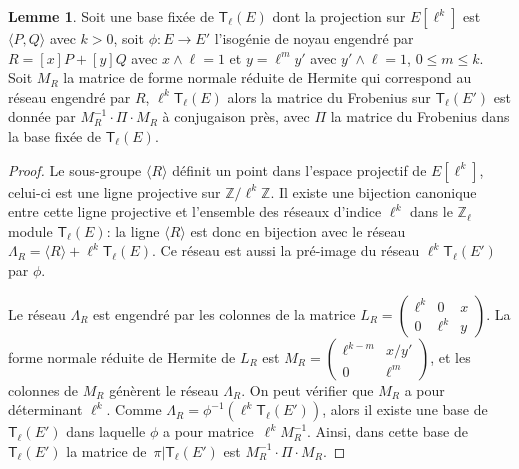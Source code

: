 \documentclass[10pt,a4paper]{book}
\theoremstyle{plain}
\theoremstyle{definition}
\theoremstyle{definition}
\newtheorem{lem}[thm]{Lemme}
\theoremstyle{definition}
\theoremstyle{definition}
\theoremstyle{definition}
\theoremstyle{remark}
\theoremstyle{remark}
\theoremstyle{definition}
\begin{document}
\begin{lem}
\label{lem:iso:con}
Soit une base fixée de $\mathsf{T}_{\ell}(E)$ dont la projection sur 
$E[\ell^{k}]$ est $\langle P, Q \rangle$ avec $k>0$, soit $\phi:E 
\rightarrow E'$ l'isogénie de noyau engendré par $R=[x]P+[y]Q$  avec $x\wedge 
\ell =1$ et $y=\ell^my'$ avec $y' \wedge \ell =1$, $0 \leqslant m \leqslant k$.
Soit $M_R$ la matrice de forme normale réduite de Hermite qui correspond au réseau 
engendré par $R$, $\ell^k\mathsf{T}_{\ell}(E)$ alors la matrice du Frobenius sur 
$\mathsf{T}_{\ell}(E')$ est donnée par $M_R^{-1} \cdot \Pi \cdot M_R$ à 
conjugaison près, avec $\Pi$ la matrice du Frobenius dans la base fixée de 
$\mathsf{T}_{\ell}(E)$.


%
% 
\end{lem}

\begin{proof}
Le sous-groupe $\langle R \rangle$ définit un point dans l'espace projectif de $E[\ell^k]$,
celui-ci est une ligne projective sur $\mathbb{Z}/\ell^k \mathbb{Z}$. Il existe 
une bijection canonique~\cite[II.1.1]{Serre77} entre cette ligne projective et 
l'ensemble des réseaux d'indice $\ell^k$ dans le $\mathbb{Z}_{\ell}$ module $\mathsf{T}_{\ell}(E)$:
la ligne $\langle R \rangle$ est donc en bijection avec le réseau~$\Lambda_R = 
\langle R \rangle + \ell^k \mathsf{T}_{\ell}(E)$. Ce réseau est aussi la pré-image du réseau 
$\ell^k\mathsf{T}_{\ell}(E')$ par $\phi$.

Le réseau $\Lambda_R$ est engendré par les colonnes de la matrice 
$L_R = \left (\begin{smallmatrix}\ell^k & 0 & x\\0 & \ell^k & y\end{smallmatrix} \right )$.
La forme normale réduite de Hermite de $L_R$ est 
$M_R = \left (\begin{smallmatrix}\ell^{k-m} & x/y' \\ 0 & \ell^m\end{smallmatrix}\right )$,
et les colonnes de $M_R$ génèrent le réseau $\Lambda_R$.
On peut vérifier que $M_R$ a pour déterminant $\ell^k$.
Comme $\Lambda_R = \phi^{-1} (\ell^k \mathsf{T}_{\ell} (E'))$,
alors il existe une base de~$\mathsf{T}_{\ell}(E')$
dans laquelle $\phi$ a pour matrice~$\ell^k M_R^{-1}$.
Ainsi, dans cette base de ~$\mathsf{T}_{\ell}(E')$
la matrice de~$\pi|\mathsf{T}_{\ell}(E')$ est $M_R^{-1} \cdot \Pi \cdot M_R^{}$.
\end{proof}
\end{document}
